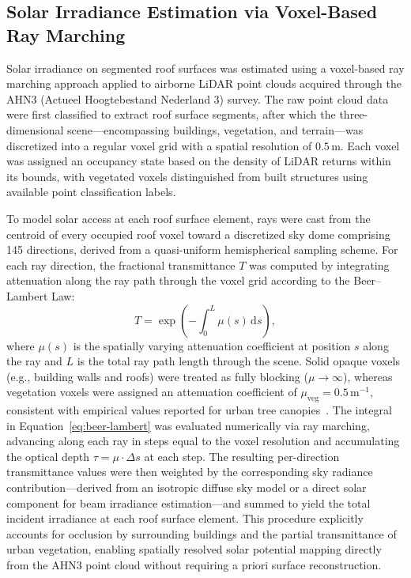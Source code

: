 \subsection*{Solar Irradiance Estimation via Voxel-Based Ray Marching}

Solar irradiance on segmented roof surfaces was estimated using a voxel-based ray marching approach applied to airborne LiDAR point clouds acquired through the AHN3 (Actueel Hoogtebestand Nederland 3) survey. The raw point cloud data were first classified to extract roof surface segments, after which the three-dimensional scene---encompassing buildings, vegetation, and terrain---was discretized into a regular voxel grid with a spatial resolution of $0.5\,\mathrm{m}$. Each voxel was assigned an occupancy state based on the density of LiDAR returns within its bounds, with vegetated voxels distinguished from built structures using available point classification labels.

To model solar access at each roof surface element, rays were cast from the centroid of every occupied roof voxel toward a discretized sky dome comprising 145 directions, derived from a quasi-uniform hemispherical sampling scheme. For each ray direction, the fractional transmittance $T$ was computed by integrating attenuation along the ray path through the voxel grid according to the Beer--Lambert Law:
%
\begin{equation}
    T = \exp\!\left(-\int_{0}^{L} \mu(s)\,\mathrm{d}s\right),
    \label{eq:beer-lambert}
\end{equation}
%
\noindent where $\mu(s)$ is the spatially varying attenuation coefficient at position $s$ along the ray and $L$ is the total ray path length through the scene. Solid opaque voxels (e.g., building walls and roofs) were treated as fully blocking ($\mu \to \infty$), whereas vegetation voxels were assigned an attenuation coefficient of $\mu_{\mathrm{veg}} = 0.5\,\mathrm{m}^{-1}$, consistent with empirical values reported for urban tree canopies~\cite{Widlowski2006}. The integral in Equation~\ref{eq:beer-lambert} was evaluated numerically via ray marching, advancing along each ray in steps equal to the voxel resolution and accumulating the optical depth $\tau = \mu \cdot \Delta s$ at each step. The resulting per-direction transmittance values were then weighted by the corresponding sky radiance contribution---derived from an isotropic diffuse sky model or a direct solar component for beam irradiance estimation---and summed to yield the total incident irradiance at each roof surface element. This procedure explicitly accounts for occlusion by surrounding buildings and the partial transmittance of urban vegetation, enabling spatially resolved solar potential mapping directly from the AHN3 point cloud without requiring a priori surface reconstruction.
